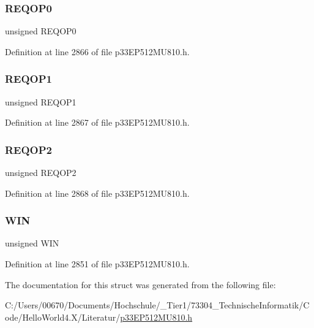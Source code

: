 \subsubsection{\texorpdfstring{R\+E\+Q\+O\+P0}{REQOP0}}
{\footnotesize\ttfamily unsigned R\+E\+Q\+O\+P0}



Definition at line 2866 of file p33\+E\+P512\+M\+U810.\+h.

\mbox{\label{structtag_c1_c_t_r_l1_b_i_t_s_a0f28e42eb67e01b2b0b5e0f80f9b549d}} 
\subsubsection{\texorpdfstring{R\+E\+Q\+O\+P1}{REQOP1}}
{\footnotesize\ttfamily unsigned R\+E\+Q\+O\+P1}



Definition at line 2867 of file p33\+E\+P512\+M\+U810.\+h.

\mbox{\label{structtag_c1_c_t_r_l1_b_i_t_s_adc514515672b885adedefd72b3633293}} 
\subsubsection{\texorpdfstring{R\+E\+Q\+O\+P2}{REQOP2}}
{\footnotesize\ttfamily unsigned R\+E\+Q\+O\+P2}



Definition at line 2868 of file p33\+E\+P512\+M\+U810.\+h.

\mbox{\label{structtag_c1_c_t_r_l1_b_i_t_s_a90ca5ea17e8ea3beddc52942ba75c12d}} 
\subsubsection{\texorpdfstring{W\+IN}{WIN}}
{\footnotesize\ttfamily unsigned W\+IN}



Definition at line 2851 of file p33\+E\+P512\+M\+U810.\+h.



The documentation for this struct was generated from the following file\+:\begin{DoxyCompactItemize}
\item 
C\+:/\+Users/00670/\+Documents/\+Hochschule/\+\_\+\+Tier1/73304\+\_\+\+Technische\+Informatik/\+Code/\+Hello\+World4.\+X/\+Literatur/\hyperlink{p33_e_p512_m_u810_8h}{p33\+E\+P512\+M\+U810.\+h}\end{DoxyCompactItemize}
